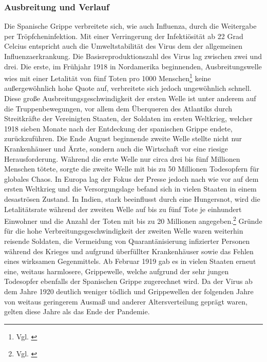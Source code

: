 \documentclass[12pt]{article}
\begin{document}
\subsubsection{Ausbreitung und Verlauf}
Die Spanische Grippe verbreitete sich, wie auch Influenza, durch die Weitergabe per Tröpfcheninfektion. Mit einer Verringerung der Infektiösität ab 22 Grad Celcius entspricht auch die Umweltstabilität des Virus dem der allgemeinen Influenzaerkrankung. Die Basisreproduktionszahl des Virus lag zwischen zwei und drei. Die erste, im Frühjahr 1918 in Nordamerika beginnenden, Ausbreitungswelle wies mit einer Letalität von fünf Toten pro 1000 Menschen\footnote{Vgl. \cite{Jeff06}} keine außergewöhnlich hohe Quote auf, verbreitete sich jedoch ungewöhnlich schnell. Diese große Ausbreitungsgeschwindigkeit der ersten Welle ist unter anderem auf die Truppenbewegungen, vor allem dem Überqueren des Atlantiks durch Streitkräfte der Vereinigten Staaten, der Soldaten im ersten Weltkrieg, welcher 1918 sieben Monate nach der Entdeckung der spanischen Grippe endete, zurückzuführen. 
Die Ende August beginnende zweite Welle stellte nicht nur Krankenhäuser und Ärzte, sondern auch die Wirtschaft vor eine riesige Herausforderung. Während die erste Welle nur circa drei bis fünf Millionen Menschen tötete, sorgte die zweite Welle mit bis zu 50 Millionen Todesopfern für globales Chaos. In Europa lag der Fokus der Presse jedoch nach wie vor auf dem ersten Weltkrieg und die Versorgungslage befand sich in vielen Staaten in einem desaströsen Zustand. In Indien, stark beeinflusst durch eine Hungersnot,  wird die Letalitätsrate während der zweiten Welle auf bis zu fünf Tote je einhundert Einwohner und die Anzahl der Toten mit bis zu 20 Millionen angegeben.\footnote{Vgl. \cite{Bax20}} Gründe für die hohe Verbreitungsgeschwindigkeit der zweiten Welle waren weiterhin reisende Soldaten, die Vermeidung von Quarantänisierung infizierter Personen während des Krieges und aufgrund überfüllter Krankenhäuser sowie das Fehlen eines wirksamen Gegenmittels.
Ab Februar 1919 gab es in vielen Staaten erneut eine, weitaus harmlosere, Grippewelle, welche aufgrund der sehr jungen Todesopfer ebenfalls der Spanischen Grippe zugerechnet wird. Da der Virus ab dem Jahre 1920 deutlich weniger tödlich und Grippewellen der folgenden Jahre von weitaus geringerem Ausmaß und anderer Altersverteilung geprägt waren, gelten diese Jahre als das Ende der Pandemie.
\end{document}

